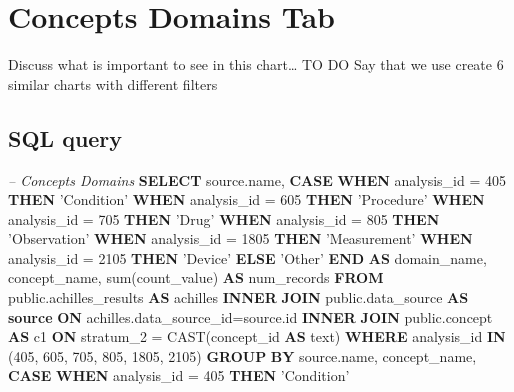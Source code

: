 \documentclass[]{book}
\newenvironment{Shaded}{\begin{snugshade}}{\end{snugshade}}
\newcommand{\KeywordTok}[1]{\textcolor[rgb]{0.13,0.29,0.53}{\textbf{#1}}}
\newcommand{\DecValTok}[1]{\textcolor[rgb]{0.00,0.00,0.81}{#1}}
\newcommand{\StringTok}[1]{\textcolor[rgb]{0.31,0.60,0.02}{#1}}
\newcommand{\CommentTok}[1]{\textcolor[rgb]{0.56,0.35,0.01}{\textit{#1}}}
\newcommand{\FunctionTok}[1]{\textcolor[rgb]{0.00,0.00,0.00}{#1}}
\newcommand{\NormalTok}[1]{#1}
\begin{document}
\section{Concepts Domains Tab}\label{concepts-domains-tab}

Discuss what is important to see in this chart\ldots{} TO DO Say that we
use create 6 similar charts with different filters

\subsection{SQL query}\label{sql-query-17}

\begin{Shaded}
\begin{Highlighting}[]
\CommentTok{-- Concepts Domains}
\KeywordTok{SELECT}\NormalTok{ source.name,}
    \KeywordTok{CASE} \KeywordTok{WHEN}\NormalTok{ analysis_id = }\DecValTok{405} \KeywordTok{THEN} \StringTok{'Condition'}
    \KeywordTok{WHEN}\NormalTok{ analysis_id = }\DecValTok{605} \KeywordTok{THEN} \StringTok{'Procedure'}
    \KeywordTok{WHEN}\NormalTok{ analysis_id = }\DecValTok{705} \KeywordTok{THEN} \StringTok{'Drug'}
    \KeywordTok{WHEN}\NormalTok{ analysis_id = }\DecValTok{805} \KeywordTok{THEN} \StringTok{'Observation'}
    \KeywordTok{WHEN}\NormalTok{ analysis_id = }\DecValTok{1805} \KeywordTok{THEN} \StringTok{'Measurement'}
    \KeywordTok{WHEN}\NormalTok{ analysis_id = }\DecValTok{2105} \KeywordTok{THEN} \StringTok{'Device'}
    \KeywordTok{ELSE} \StringTok{'Other'} \KeywordTok{END} \KeywordTok{AS}\NormalTok{ domain_name,}
\NormalTok{    concept_name, }\FunctionTok{sum}\NormalTok{(count_value) }\KeywordTok{AS}\NormalTok{ num_records}
\KeywordTok{FROM}\NormalTok{ public.achilles_results }\KeywordTok{AS}\NormalTok{ achilles }
    \KeywordTok{INNER} \KeywordTok{JOIN}\NormalTok{ public.data_source }\KeywordTok{AS} \KeywordTok{source} \KeywordTok{ON} 
\NormalTok{      achilles.data_source_id=source.id}
    \KeywordTok{INNER} \KeywordTok{JOIN}\NormalTok{ public.concept }\KeywordTok{AS}\NormalTok{ c1 }\KeywordTok{ON} 
\NormalTok{      stratum_2 = }\FunctionTok{CAST}\NormalTok{(concept_id }\KeywordTok{AS}\NormalTok{ text)}
\KeywordTok{WHERE}\NormalTok{ analysis_id }\KeywordTok{IN}\NormalTok{ (}\DecValTok{405}\NormalTok{, }\DecValTok{605}\NormalTok{, }\DecValTok{705}\NormalTok{, }\DecValTok{805}\NormalTok{, }\DecValTok{1805}\NormalTok{, }\DecValTok{2105}\NormalTok{)}
\KeywordTok{GROUP} \KeywordTok{BY}\NormalTok{ source.name, concept_name, }
    \KeywordTok{CASE} \KeywordTok{WHEN}\NormalTok{ analysis_id = }\DecValTok{405} \KeywordTok{THEN} \StringTok{'Condition'}

\end{Highlighting}
\end{Shaded}
\end{document}
